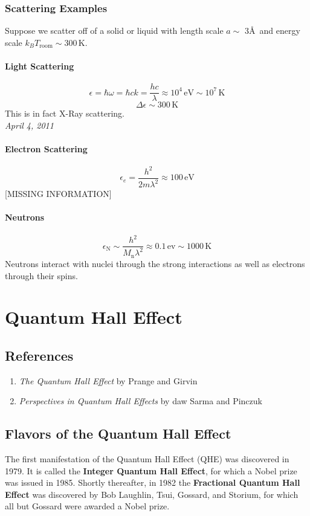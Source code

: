 \documentclass{article}
\begin{document}
			\subsubsection{Scattering Examples}
			Suppose we scatter off of a solid or liquid with length scale $a\sim$ 3\AA\  and energy scale $k_BT_{\mathrm{room}}\sim300\,\mathrm{K}$.
			\paragraph{Light Scattering} 
			$$\epsilon=\hbar\omega=\hbar ck=\frac{hc}{\lambda}\approx 10^4\,\mathrm{eV}\sim10^7\,\mathrm{K}$$
			$$\Delta \epsilon\sim 300\,\mathrm{K}$$
			This is in fact X-Ray scattering.\\
			
			\noindent\textit{April 4, 2011}
			\paragraph{Electron Scattering} 
			$$\epsilon_e=\frac{h^2}{2m\lambda^2}\approx 100\,\mathrm{eV}$$
			[MISSING INFORMATION]
			\paragraph {Neutrons}
			$$\epsilon_\mathrm{N}\sim \frac{h^2}{M_\mathrm{n}\lambda^2}\approx 0.1\,\mathrm{ev}\sim 1000\,\mathrm{K}$$
			Neutrons interact with nuclei through the strong interactions as well as electrons through their spins.
	\section{Quantum Hall Effect}
	\subsection{References}
		\begin{enumerate}
		\item \textit{The Quantum  Hall Effect} by Prange and Girvin
		\item \textit{Perspectives in Quantum Hall Effects} by daw Sarma and Pinczuk
		\end{enumerate}
	\subsection{Flavors of the Quantum Hall Effect}
	The first manifestation of the Quantum Hall Effect (QHE) was discovered in 1979. It is called the \textbf{Integer Quantum Hall Effect}, for which a Nobel prize was issued in 1985. Shortly thereafter, in 1982 the \textbf{Fractional Quantum Hall Effect}  was discovered by Bob Laughlin, Tsui, Gossard, and Storium, for which all but Gossard were awarded a Nobel prize.
\end{document}
